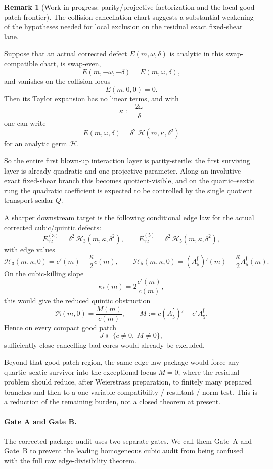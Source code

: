 \documentclass[11pt,a4paper]{amsart}
\theoremstyle{plain}
\theoremstyle{definition}
\newtheorem{remark}[theorem]{Remark}
\begin{document}
\begin{remark}[Work in progress: parity/projective factorization and the local good-patch frontier]
\label{rem:wip-parity-projective-factorization-collision-blow-up}
The collision-cancellation chart suggests a substantial weakening of the
hypotheses needed for local exclusion on the residual exact fixed-shear lane.

Suppose that an actual corrected defect $E(m,\omega,\delta)$ is analytic in
this swap-compatible chart, is swap-even,
\[
E(m,-\omega,-\delta)=E(m,\omega,\delta),
\]
and vanishes on the collision locus
\[
E(m,0,0)=0.
\]
Then its Taylor expansion has no linear terms, and with
\[
\kappa:=\frac{2\omega}{\delta}
\]
one can write
\[
E(m,\omega,\delta)=\delta^2\,\mathcal H(m,\kappa,\delta^2)
\]
for an analytic germ $\mathcal H$.

So the entire first blown-up interaction layer is parity-sterile: the first
surviving layer is already quadratic and one-projective-parameter. Along an
involutive exact fixed-shear branch this becomes quotient-visible, and on the
quartic--sextic rung the quadratic coefficient is expected to be controlled by
the single quotient transport scalar $Q$.

A sharper downstream target is the following conditional edge law for the
actual corrected cubic/quintic defects:
\[
E_{12}^{(3)}=\delta^2\,\mathcal H_3(m,\kappa,\delta^2),
\qquad
E_{12}^{(5)}=\delta^2\,\mathcal H_5(m,\kappa,\delta^2),
\]
with edge values
\[
\mathcal H_3(m,\kappa,0)=c'(m)-\frac{\kappa}{2}c(m),
\qquad
\mathcal H_5(m,\kappa,0)=(A_5^{\mathfrak f})'(m)-\frac{\kappa}{2}A_5^{\mathfrak f}(m).
\]
On the cubic-killing slope
\[
\kappa_*(m)=2\frac{c'(m)}{c(m)},
\]
this would give the reduced quintic obstruction
\[
\mathfrak R(m,0)=\frac{M(m)}{c(m)},
\qquad
M:=c(A_5^{\mathfrak f})'-c'A_5^{\mathfrak f}.
\]
Hence on every compact good patch
\[
J\Subset\{c\neq 0,\ M\neq 0\},
\]
sufficiently close cancelling bad cores would already be excluded.

Beyond that good-patch region, the same edge-law package would force any
quartic--sextic survivor into the exceptional locus $M=0$, where the residual
problem should reduce, after Weierstrass preparation, to finitely many prepared
branches and then to a one-variable compatibility / resultant / norm test.
This is a reduction of the remaining burden, not a closed theorem at present.
\end{remark}

\paragraph{Gate A and Gate B.}
\label{par:gate-a-gate-b}
\label{subsec:gate-a-gate-b}
The corrected-package audit uses two separate gates.  We call them Gate~A
and Gate~B to prevent the leading homogeneous cubic audit from being
confused with the full raw edge-divisibility theorem.
\end{document}

